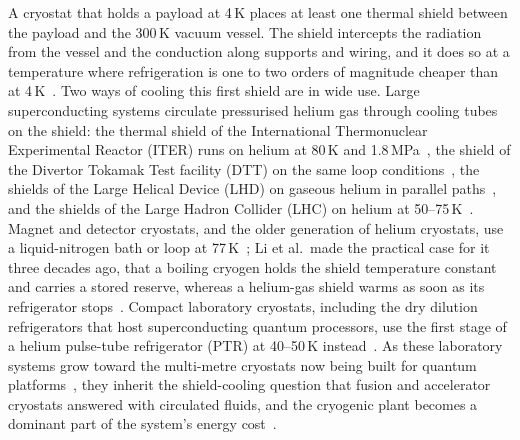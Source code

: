 \documentclass[preprint,12pt]{elsarticle}
\begin{document}
A cryostat that holds a payload at 4\,K places at least one thermal shield between the payload
and the 300\,K vacuum vessel. The shield intercepts the radiation from the vessel and the
conduction along supports and wiring, and it does so at a temperature where refrigeration is
one to two orders of magnitude cheaper than at 4\,K~\cite{21-Weisend2016Cryostat,
BarronNellis2016Cryogenic, Shu2024AdvancedCryostats}. Two ways of cooling this first shield
are in wide use. Large superconducting systems circulate pressurised helium gas through
cooling tubes on the shield: the thermal shield of the International Thermonuclear Experimental Reactor (ITER) runs on helium at 80\,K and
1.8\,MPa~\cite{Nam2014ITERThermalShield}, the shield of the Divertor Tokamak Test facility (DTT) on the same loop
conditions~\cite{Barone2020DTTShield}, the shields of the Large Helical Device (LHD) on gaseous helium in parallel
paths~\cite{Imagawa2002LHDShield}, and the shields of the Large Hadron Collider (LHC) on helium at
50--75\,K~\cite{Lebrun2000LHCCryogenics, Claudet2010LHCExergy}. Magnet and detector
cryostats, and the older generation of helium cryostats, use a liquid-nitrogen bath or loop
at 77\,K~\cite{23-Pieterman1986MRICooling, 24-Iwasa2009SuperconductingMagnets}; Li et
al.\ made the practical case for it three decades ago, that a boiling cryogen holds the shield
temperature constant and carries a stored reserve, whereas a helium-gas shield warms as soon
as its refrigerator stops~\cite{Li1990SMESIntercepts}. Compact laboratory cryostats,
including the dry dilution refrigerators that host superconducting quantum processors, use
the first stage of a helium pulse-tube refrigerator (PTR) at 40--50\,K
instead~\cite{Uhlig2004DryDR, 19-deWaele2011Cryocoolers, 6-Krinner2019CryogenicSetup}. As
these laboratory systems grow toward the multi-metre cryostats now being built for quantum
platforms~\cite{3-GumannChow2022Goldeneye, 12-Hollister2021Millikelvin}, they inherit the
shield-cooling question that fusion and accelerator cryostats answered with circulated
fluids, and the cryogenic plant becomes a dominant part of the system's energy
cost~\cite{5-PRXQuantum.3.020101, 4-DeMichielisFerraro2025EnergyPowerScaling,
Martin2021QuantumDataCenters}.
\end{document}
